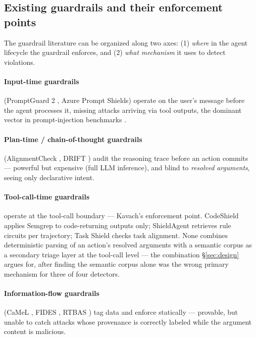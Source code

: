 \subsection{Existing guardrails and their enforcement points}

The guardrail literature can be organized along two axes: (1) \emph{where} in
the agent lifecycle the guardrail enforces, and (2) \emph{what mechanism}
it uses to detect violations.

\paragraph{Input-time guardrails} (PromptGuard 2
\cite{saxe2025llamafirewall}, Azure Prompt Shields) operate on the user's
message before the agent processes it, missing attacks arriving via tool
outputs, the dominant vector in prompt-injection benchmarks
\cite{zhan2024injecagent}.

\paragraph{Plan-time / chain-of-thought guardrails} (AlignmentCheck
\cite{saxe2025llamafirewall}, DRIFT \cite{drift2026}) audit the reasoning
trace before an action commits --- powerful but expensive (full LLM
inference), and blind to \emph{resolved arguments}, seeing only
declarative intent.

\paragraph{Tool-call-time guardrails} operate at the tool-call boundary ---
Kavach's enforcement point. CodeShield \cite{saxe2025llamafirewall} applies
Semgrep to code-returning outputs only; ShieldAgent
\cite{chen2025shieldagent} retrieves rule circuits per trajectory; Task
Shield \cite{jia2025taskshield} checks task alignment. None combines
deterministic parsing of an action's resolved arguments with a semantic
corpus as a secondary triage layer at the tool-call level --- the
combination \S\ref{sec:design} argues for, after finding the semantic
corpus alone was the wrong primary mechanism for three of four detectors.

\paragraph{Information-flow guardrails} (CaMeL \cite{debenedetti2025camel},
FIDES \cite{costa2025fides}, RTBAS \cite{zhong2025rtbas}) tag data and
enforce statically --- provable, but unable to catch attacks whose
provenance is correctly labeled while the argument content is malicious.

